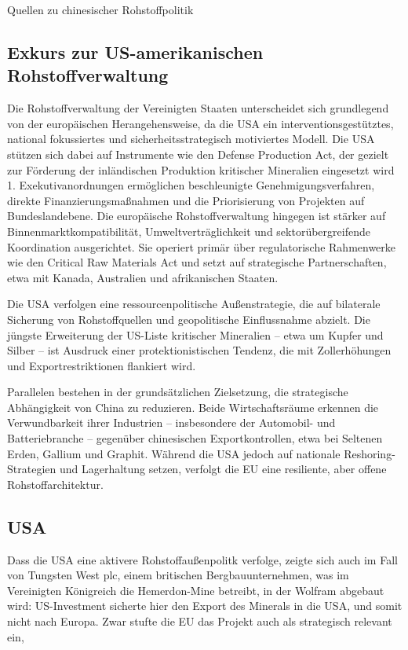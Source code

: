\documentclass[12pt,a4paper,oneside]{book} %
\begin{document}
Quellen zu chinesischer Rohstoffpolitik

\subsection{Exkurs zur US-amerikanischen Rohstoffverwaltung}
Die Rohstoffverwaltung der Vereinigten Staaten unterscheidet sich grundlegend von der europäischen Herangehensweise, da die USA ein interventionsgestütztes, national fokussiertes und sicherheitsstrategisch motiviertes Modell. Die USA stützen sich dabei auf Instrumente wie den Defense Production Act, der gezielt zur Förderung der inländischen Produktion kritischer Mineralien eingesetzt wird 1. Exekutivanordnungen ermöglichen beschleunigte Genehmigungsverfahren, direkte Finanzierungsmaßnahmen und die Priorisierung von Projekten auf Bundeslandebene. Die europäische Rohstoffverwaltung hingegen ist stärker auf Binnenmarktkompatibilität, Umweltverträglichkeit und sektorübergreifende Koordination ausgerichtet. Sie operiert primär über regulatorische Rahmenwerke wie den Critical Raw Materials Act und setzt auf strategische Partnerschaften, etwa mit Kanada, Australien und afrikanischen Staaten.

Die USA verfolgen eine ressourcenpolitische Außenstrategie, die auf bilaterale Sicherung von Rohstoffquellen und geopolitische Einflussnahme abzielt. Die jüngste Erweiterung der US-Liste kritischer Mineralien – etwa um Kupfer und Silber – ist Ausdruck einer protektionistischen Tendenz, die mit Zollerhöhungen und Exportrestriktionen flankiert wird.

Parallelen bestehen in der grundsätzlichen Zielsetzung, die strategische Abhängigkeit von China zu reduzieren. Beide Wirtschaftsräume erkennen die Verwundbarkeit ihrer Industrien – insbesondere der Automobil- und Batteriebranche – gegenüber chinesischen Exportkontrollen, etwa bei Seltenen Erden, Gallium und Graphit. Während die USA jedoch auf nationale Reshoring-Strategien und Lagerhaltung setzen, verfolgt die EU eine resiliente, aber offene Rohstoffarchitektur.

\subsection{USA}

Dass die USA eine aktivere Rohstoffaußenpolitk verfolge, zeigte sich auch im Fall von Tungsten West plc, einem britischen Bergbauunternehmen, was im Vereinigten Königreich die Hemerdon-Mine betreibt, in der Wolfram abgebaut wird: US-Investment sicherte hier den Export des Minerals in die USA, und somit nicht nach Europa. Zwar stufte die EU das Projekt auch als strategisch relevant ein,
\end{document}
